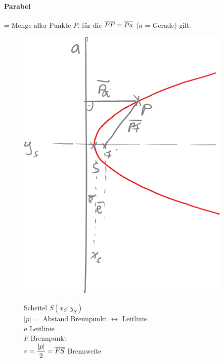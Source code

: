 \begin{enumerate}[A)]
	\paragraph{Parabel} = Menge aller Punkte $P$, für die $\overline{PF}=\overline{Pa}$ ($a$ = Gerade) gilt.
	\begin{figure}[h!]
		\begin{minipage}{6cm}
			\includegraphics[width=\linewidth]{Bilder/125}
			\caption{}
		\end{minipage}
		\quad
		\begin{minipage}{\linewidth-6cm - 1em}
			Scheitel $S(x_S;y_S)$\\
			$|p|=$ Abstand Brennpunkt $\leftrightarrow$ Leitlinie\\
			$a$ Leitlinie\\
			$F$ Brennpunkt\\
			$e=\dfrac{|p|}{2}=\overline{FS}$ Brennweite
		\end{minipage}
	\end{figure}
	

\end{enumerate}
